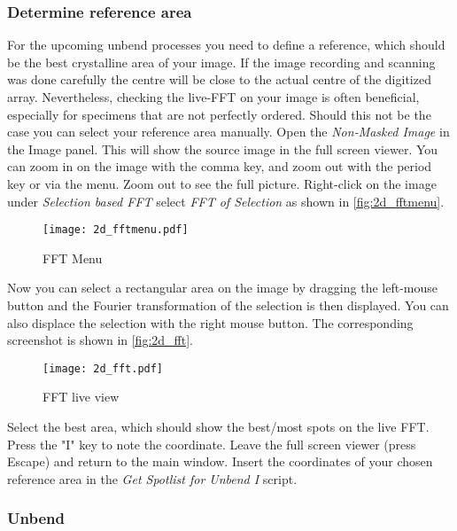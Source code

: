 \subsubsection{Determine reference area}
\label{sec:reference}

For the upcoming unbend processes you need to define a reference, which should be the best crystalline area of your image. If the image recording and scanning was done carefully the centre will be close to the actual centre of the digitized array. Nevertheless, checking the live-FFT on your image is often beneficial, especially for specimens that are not perfectly ordered. Should this not be the case you can select your reference area manually. 
Open the \textit{Non-Masked Image} in the Image panel. This will show the source image in the full screen viewer. You can zoom in on the image with the comma key, and zoom out with the period key or via the menu. Zoom out to see the full picture. Right-click on the image under \textit{Selection based FFT} select \textit{FFT of Selection} as shown in \autoref{fig:2d_fftmenu}. 
	
	
		\begin{figure}[H]
		\centering
		\texttt{[image: 2d\_fftmenu.pdf]}
		\caption{FFT Menu}
		\label{fig:2d_fftmenu}
	\end{figure}
	
	Now you can select a rectangular area on the image by dragging the left-mouse button and the Fourier transformation of the selection is then displayed. You can also displace the selection with the right mouse button. The corresponding screenshot is shown in \autoref{fig:2d_fft}.

	\begin{figure}[H]
		\centering
		\texttt{[image: 2d\_fft.pdf]}
		\caption{FFT live view}
		\label{fig:2d_fft}
	\end{figure}
	
Select the best area, which should show the best/most spots on the live FFT. Press the "I" key to note the coordinate. Leave the full screen viewer (press Escape) and return to the main window. Insert the coordinates of your chosen reference area in the \textit{Get Spotlist for Unbend I} script. 



\subsubsection{Unbend}
\label{sec:Unbend}

